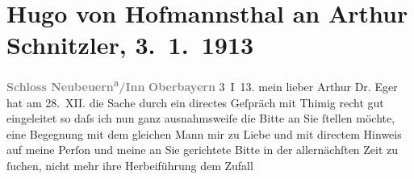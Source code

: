 

         
         \renewcommand{\erwaehntePersonen}{Personen: Paul Eger, Albert Heine, Alexander Moissi, Max Reinhardt, Hugo Thimig}
         \renewcommand{\erwaehnteInstitutionen}{Institutionen: Burgtheater}
         \renewcommand{\erwaehnteOrte}{Orte: Dresden, Neubeuern, Rodaun, Wien}
         \renewcommand{\erwaehnteWerke}{Werke: Jedermann. Das Spiel vom Sterben des reichen Mannes}
               \section[Hugo von Hofmannsthal an Arthur Schnitzler, 3. 1. 1913]{ Hugo von Hofmannsthal an Arthur Schnitzler, 3. 1. 1913}\nopagebreak{}\rehead{ }\begin{ledgroupsized}[t]{13cm}\normalsize\beginnumbering \toendnotes[C]{\smallbreak\pagebreak[2]} 
\toendnotes[C]{\smallbreak}\pstart
           \noindent{}{\pb}\textcolor{gray}{\textbf{Schloss Neubeuern\textsuperscript{a}/Inn}}\pend
           \pstart
           \textcolor{gray}{\textbf{Oberbayern}}\pend
           \pstart
           \raggedleft{}3 I 13.\pend
           \pstart{}mein lieber Arthur \pend\pstart
           Dr. Eger hat am 28. XII. die Sache
               durch ein directes Geſpräch mit Thimig recht gut
               eingeleitet so daſs ich nun ganz ausnahmsweiſe die  Bitte an Sie ſtellen möchte, eine Begegnung mit dem gleichen Mann
               mir zu Liebe und mit directem Hinweis auf meine Perſon und meine an Sie gerichtete
               Bitte in der allernächſten Zeit zu ſuchen, nicht mehr ihre Herbeiführung dem Zufall

\end{ledgroupsized}
